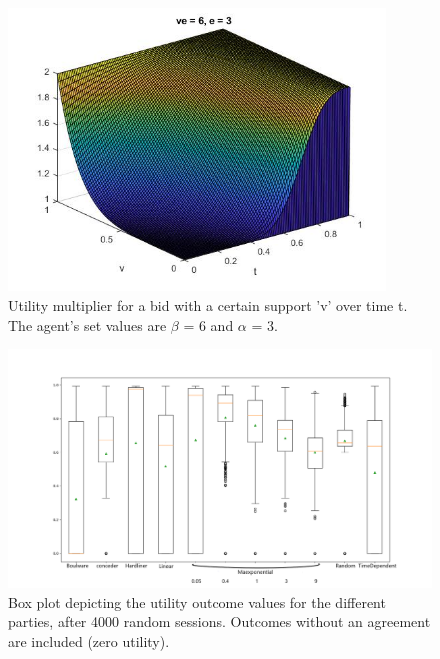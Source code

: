             
            \begin{figure}[H]
                \centering
                \includegraphics[width=10cm]{figures/powersurface.jpeg}
                \caption{Utility multiplier for a bid with a certain support 'v' over time t. The agent's set values are $\beta$ = 6 and $\alpha$ = 3.}
                \label{fig:powersurface}
            \end{figure} 
            
            
            \begin{figure}[H]
                \centering
                \includegraphics[width=15cm]{figures/Basic_test_1.png}
                \caption{Box plot depicting the utility outcome values for the different parties, after 4000 random sessions. Outcomes without an agreement are included (zero utility).}
                \label{fig:test_1}
            \end{figure}
            
